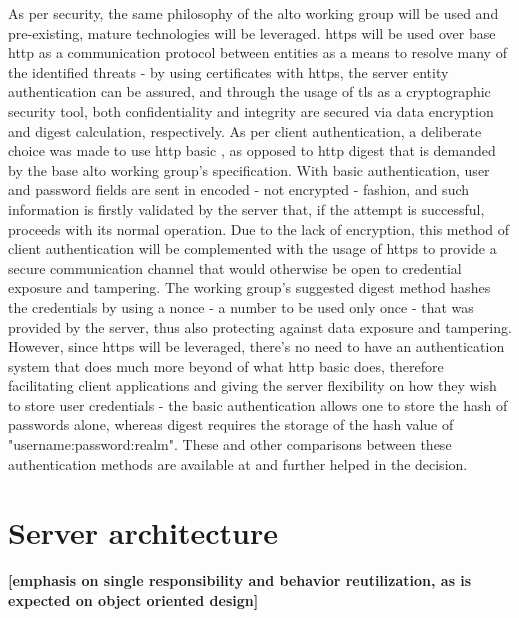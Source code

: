     As per security, the same philosophy of the \gls{alto} working group will be used and pre-existing, mature technologies will be leveraged.
    \gls{https} will be used over base \gls{http} as a communication protocol between entities as a means to resolve many of the identified threats - by using certificates with \gls{https}, the server entity authentication can be assured, and through the usage of \gls{tls} as a cryptographic security tool, both confidentiality and integrity are secured via data encryption and digest calculation, respectively.
    As per client authentication, a deliberate choice was made to use \gls{http} basic \cite{http-basic}, as opposed to \gls{http} digest \cite{http-digest} that is demanded by the base \gls{alto} working group's specification.
    With basic authentication, user and password fields are sent in encoded - not encrypted - fashion, and such information is firstly validated by the server that, if the attempt is successful, proceeds with its normal operation.
    Due to the lack of encryption, this method of client authentication will be complemented with the usage of \gls{https} to provide a secure communication channel that would otherwise be open to credential exposure and tampering.
    The working group's suggested digest method hashes the credentials by using a nonce - a number to be used only once - that was provided by the server, thus also protecting against data exposure and tampering.
    However, since \gls{https} will be leveraged, there's no need to have an authentication system that does much more beyond of what \gls{http} basic does, therefore facilitating client applications and giving the server flexibility on how they wish to store user credentials - the basic authentication allows one to store the hash of passwords alone, whereas digest requires the storage of the hash value of "username:password:realm".
    These and other comparisons between these authentication methods are available at \cite{https://sci-hub.se/https://link.springer.com/chapter/10.1007/978-1-4302-6817-8_3} and further helped in the decision.


\section{Server architecture}


    \textbf{[emphasis on single responsibility and behavior reutilization, as is expected on object oriented design]}

